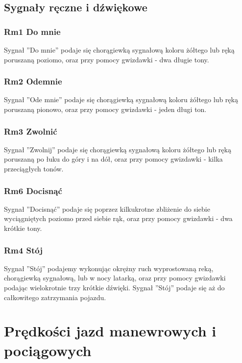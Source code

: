 \section{Sygnały ręczne i dźwiękowe}
\subsection{Rm1 Do mnie}
Sygnał ''Do mnie'' podaje się chorągiewką sygnałową koloru żółtego lub ręką poruszaną poziomo, oraz przy pomocy gwizdawki - dwa długie tony.

\subsection{Rm2 Odemnie}
Sygnał ''Ode mnie'' podaje się chorągiewką sygnałową koloru żółtego lub ręką poruszaną pionowo, oraz przy pomocy gwizdawki - jeden długi ton.
\subsection{Rm3 Zwolnić}
Sygnał ''Zwolnij'' podaje się chorągiewką sygnałową koloru żółtego lub ręką poruszaną po łuku do góry i na dół, oraz przy pomocy gwizdawki - kilka przeciągłych tonów.
\subsection{Rm6 Docisnąć}
Sygnał ''Docisnąć'' podaje się poprzez kilkukrotne zbliżenie do siebie wyciągniętych poziomo przed siebie rąk, oraz przy pomocy gwizdawki - dwa krótkie tony.
\subsection{Rm4 Stój}
Sygnał ''Stój'' podajemy wykonując okrężny ruch wyprostowaną reką, chorągiewką sygnałową, lub w nocy latarką, oraz przy pomocy gwizdawki podając wielokrotnie trzy krótkie dźwięki. Sygnał ''Stój'' podaje się aż do całkowitego zatrzymania pojazdu.

\chapter{Prędkości jazd manewrowych i pociągowych}

